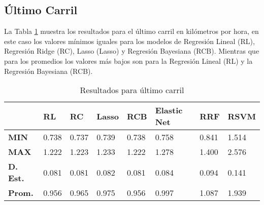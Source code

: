 \subsection{Último Carril}

La Tabla \ref{tab:resultadosScikitUltimoCarril} muestra los resultados para el último carril en kilómetros por hora, en este caso los valores mínimos iguales para los modelos de Regresión Lineal (RL), Regresión Ridge (RC), Lasso (Lasso) y Regresión Bayesiana (RCB). Mientras que para los promedios los valores más bajos son para la Regresión Lineal (RL) y la Regresión Bayesiana (RCB).

\begin{table}[H]
    \centering
    \caption{Resultados para último carril}
    \label{tab:resultadosScikitUltimoCarril}
    \begin{tabular}{|l|l|l|l|l|l|l|l|}
    \hline
        & \textbf{RL} & \textbf{RC} & \textbf{Lasso} & \textbf{RCB} & \textbf{Elastic Net} & \textbf{RRF} & \textbf{RSVM} \\ \hline
        \textbf{MIN} & 0.738 & 0.737 & 0.739 & 0.738 & 0.758 & 0.841 & 1.514 \\ \hline
        \textbf{MAX} & 1.222 & 1.223 & 1.233 & 1.222 & 1.278 & 1.400 & 2.576 \\ \hline
        \textbf{D. Est.} & 0.081 & 0.081 & 0.082 & 0.081 & 0.084 & 0.094 & 0.141 \\ \hline
        \textbf{Prom.} & 0.956 & 0.965 & 0.975 & 0.956 & 0.997 & 1.087 & 1.939 \\ \hline
    \end{tabular}
\end{table}


